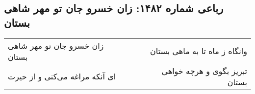 \begin{center}
\section*{رباعی شماره ۱۴۸۲: زان خسرو جان تو مهر شاهی بستان}
\label{sec:1482}
\begin{longtable}{l p{0.5cm} r}
زان خسرو جان تو مهر شاهی بستان
&&
وانگاه ز ماه تا به ماهی بستان
\\
ای آنکه مراغه می‌کنی و از حیرت
&&
تبریز بگوی و هرچه خواهی بستان
\\
\end{longtable}
\end{center}
